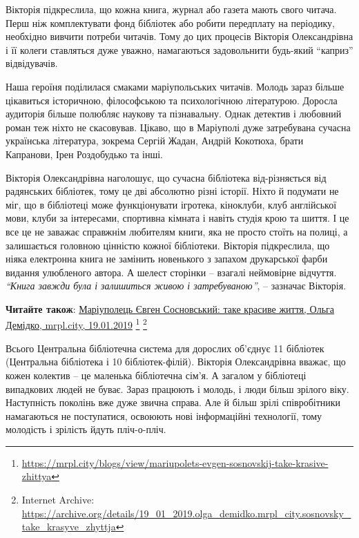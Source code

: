 Вікторія підкреслила, що кожна книга, журнал або газета мають свого читача.
Перш ніж комплектувати фонд бібліотек або робити передплату на періодику,
необхідно вивчити потреби читачів. Тому до цих процесів Вікторія Олександрівна
і її колеги ставляться дуже уважно, намагаються задовольнити будь-який \enquote{каприз}
відвідувачів.

Наша героїня поділилася смаками маріупольських читачів. Молодь зараз більше
цікавиться історичною, філософською та психологічною літературою. Доросла
аудиторія більше полюбляє наукову та пізнавальну. Однак детектив і любовний
роман теж ніхто не скасовував. Цікаво, що в Маріуполі дуже затребувана сучасна
українська література, зокрема Сергій Жадан, Андрій Кокотюха, брати Капранови,
Ірен Роздобудько та інші.


Вікторія Олександрівна наголошує, що сучасна бібліотека від\hyp{}різняється від
радянських бібліотек, тому це дві абсолютно різні історії. Ніхто й подумати не
міг, що в бібліотеці може функціонувати ігротека, кіноклуби, клуб англійської
мови, клуби за інтересами, спортивна кімната і навіть студія крою та шиття. І
це все це не заважає справжнім любителям книги, яка не просто стоїть на полиці,
а залишається головною цінністю кожної бібліотеки. Вікторія підкреслила, що
ніяка електронна книга не замінить новенького з запахом друкарської фарби
видання улюбленого автора. А шелест сторінки – взагалі неймовірне відчуття.
\emph{\enquote{Книга завжди була і залишиться живою і затребуваною}}, – зазначає Вікторія.

\textbf{Читайте також}: \href{https://mrpl.city/blogs/view/mariupolets-evgen-sosnovskij-take-krasive-zhittya}{%
Маріуполець Євген Сосновський: таке красиве життя, %
Ольга Демідко, mrpl.city, 19.01.2019}%
\footnote{\url{https://mrpl.city/blogs/view/mariupolets-evgen-sosnovskij-take-krasive-zhittya}} %
\footnote{Internet Archive: \url{https://archive.org/details/19_01_2019.olga_demidko.mrpl_city.sosnovsky_take_krasyve_zhyttja}}

Всього Центральна бібліотечна система для дорослих об'єднує 11 бібліотек
(Центральна бібліотека і 10 бібліотек-філій). Вікторія Олександрівна вважає, що
кожен колектив – це маленька бібліотечна сім'я. А загалом у бібліотеці
випадкових людей не буває. Зараз працюють і молодь, і люди більш зрілого віку.
Наступність поколінь вже дуже звична справа. Але й більш зрілі співробітники
намагаються не поступатися, освоюють нові інформаційні технології, тому
молодість і зрілість йдуть пліч-о-пліч.

